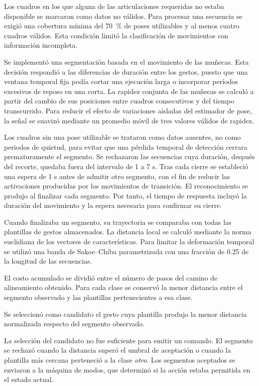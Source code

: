 Los cuadros en los que alguna de las articulaciones requeridas no estaba disponible se marcaron como datos no válidos. Para procesar una secuencia se exigió una cobertura mínima del 70 \% de poses utilizables y al menos cuatro cuadros válidos. Esta condición limitó la clasificación de movimientos con información incompleta.

Se implementó una segmentación basada en el movimiento de las muñecas. Esta decisión respondió a las diferencias de duración entre los gestos, puesto que una ventana temporal fija podía cortar una ejecución larga o incorporar períodos excesivos de reposo en una corta. La rapidez conjunta de las muñecas se calculó a partir del cambio de sus posiciones entre cuadros consecutivos y del tiempo transcurrido. Para reducir el efecto de variaciones aisladas del estimador de pose, la señal se suavizó mediante un promedio móvil de tres valores válidos de rapidez.

Los cuadros sin una pose utilizable se trataron como datos ausentes, no como periodos de quietud, para evitar que una pérdida temporal de detección cerrara prematuramente el segmento. Se rechazaron las secuencias cuya duración, después del recorte, quedaba fuera del intervalo de 1 a 7 s. Tras cada cierre se estableció una espera de 1 s antes de admitir otro segmento, con el fin de reducir las activaciones producidas por los movimientos de transición. El reconocimiento se produjo al finalizar cada segmento. Por tanto, el tiempo de respuesta incluyó la duración del movimiento y la espera necesaria para confirmar su cierre.

Cuando finalizaba un segmento, su trayectoria se comparaba con todas las plantillas de gestos almacenados. La distancia local se calculó mediante la norma euclidiana de los vectores de características. Para limitar la deformación temporal se utilizó una banda de Sakoe–Chiba parametrizada con una fracción de 0.25 de la longitud de las secuencias.

El costo acumulado se dividió entre el número de pasos del camino de alineamiento obtenido. Para cada clase se conservó la menor distancia entre el segmento observado y las plantillas pertenecientes a esa clase.

Se seleccionó como candidato el gesto cuya plantilla produjo la menor distancia normalizada respecto del segmento observado.

La selección del candidato no fue suficiente para emitir un comando. El segmento se rechazó cuando la distancia superó el umbral de aceptación o cuando la plantilla más cercana perteneció a la clase \textit{otro}. Los segmentos aceptados se enviaron a la máquina de modos, que determinó si la acción estaba permitida en el estado actual.

